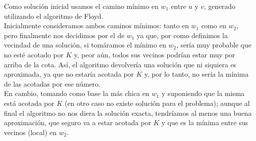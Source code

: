Como soluci\'on inicial usamos el camino m\'inimo en $w_1$ entre $u$ y $v$, generado utilizando el algoritmo de Floyd.\\
Inicialmente consideramos ambos caminos m\'inimos: tanto en $w_1$ como en $w_2$, pero finalmente nos decidimos por el de $w_1$ ya que, por como definimos la vecindad de una soluci\'on, si tom\'aramos el m\'inimo en $w_2$, ser\'ia muy probable que no est\'e acotado por $K$ y, peor a\'un, todos sus vecinos podr\'ian estar muy por arriba de la cota. As\'i, el algoritmo devolver\'ia una soluci\'on que ni siquiera es aproximada, ya que no estar\'ia acotada por $K$ y, por lo tanto, no ser\'ia la m\'inima de las acotadas por ese n\'umero.\\
En cambio, tomando como base la m\'as chica en $w_1$ y suponiendo que la misma est\'a acotada por $K$ (en otro caso no existe soluci\'on para el problema); aunque al final el algoritmo no nos diera la soluci\'on exacta, tendr\'iamos al menos una buena aproximaci\'on, que seguro va a estar acotada por $K$ y que es la m\'inima entre sus vecinos (local) en $w_2$.